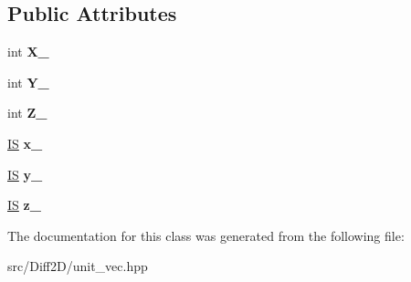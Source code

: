 \subsection*{Public Attributes}
\begin{DoxyCompactItemize}
\item 
\hypertarget{classLocalCoor_a7d72e3489aaf1b6579f7a3e0f5b30e26}{
int {\bfseries X\_\-}}
\label{classLocalCoor_a7d72e3489aaf1b6579f7a3e0f5b30e26}

\item 
\hypertarget{classLocalCoor_a5ff6668d5d6898582ddfdc5eadce58ff}{
int {\bfseries Y\_\-}}
\label{classLocalCoor_a5ff6668d5d6898582ddfdc5eadce58ff}

\item 
\hypertarget{classLocalCoor_acd97c2eb7e3b994dbc58ae98ab785280}{
int {\bfseries Z\_\-}}
\label{classLocalCoor_acd97c2eb7e3b994dbc58ae98ab785280}

\item 
\hypertarget{classLocalCoor_a2c0e974fc45c597f893b20a0c2f6869c}{
\hyperlink{structIS}{IS} {\bfseries x\_\-}}
\label{classLocalCoor_a2c0e974fc45c597f893b20a0c2f6869c}

\item 
\hypertarget{classLocalCoor_a58678d9cfb17db349a9d7fd70a2d5150}{
\hyperlink{structIS}{IS} {\bfseries y\_\-}}
\label{classLocalCoor_a58678d9cfb17db349a9d7fd70a2d5150}

\item 
\hypertarget{classLocalCoor_acdd6d24c450a43fd755f2e43d16d9991}{
\hyperlink{structIS}{IS} {\bfseries z\_\-}}
\label{classLocalCoor_acdd6d24c450a43fd755f2e43d16d9991}

\end{DoxyCompactItemize}


The documentation for this class was generated from the following file:\begin{DoxyCompactItemize}
\item 
src/Diff2D/unit\_\-vec.hpp\end{DoxyCompactItemize}
